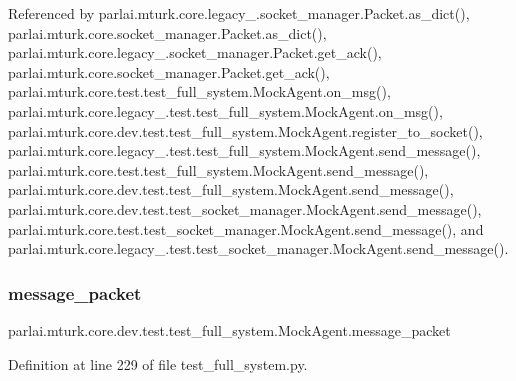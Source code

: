 Referenced by parlai.\+mturk.\+core.\+legacy\+\_.\+socket\+\_\+manager.\+Packet.\+as\+\_\+dict(), parlai.\+mturk.\+core.\+socket\+\_\+manager.\+Packet.\+as\+\_\+dict(), parlai.\+mturk.\+core.\+legacy\+\_.\+socket\+\_\+manager.\+Packet.\+get\+\_\+ack(), parlai.\+mturk.\+core.\+socket\+\_\+manager.\+Packet.\+get\+\_\+ack(), parlai.\+mturk.\+core.\+test.\+test\+\_\+full\+\_\+system.\+Mock\+Agent.\+on\+\_\+msg(), parlai.\+mturk.\+core.\+legacy\+\_.\+test.\+test\+\_\+full\+\_\+system.\+Mock\+Agent.\+on\+\_\+msg(), parlai.\+mturk.\+core.\+dev.\+test.\+test\+\_\+full\+\_\+system.\+Mock\+Agent.\+register\+\_\+to\+\_\+socket(), parlai.\+mturk.\+core.\+legacy\+\_.\+test.\+test\+\_\+full\+\_\+system.\+Mock\+Agent.\+send\+\_\+message(), parlai.\+mturk.\+core.\+test.\+test\+\_\+full\+\_\+system.\+Mock\+Agent.\+send\+\_\+message(), parlai.\+mturk.\+core.\+dev.\+test.\+test\+\_\+full\+\_\+system.\+Mock\+Agent.\+send\+\_\+message(), parlai.\+mturk.\+core.\+dev.\+test.\+test\+\_\+socket\+\_\+manager.\+Mock\+Agent.\+send\+\_\+message(), parlai.\+mturk.\+core.\+test.\+test\+\_\+socket\+\_\+manager.\+Mock\+Agent.\+send\+\_\+message(), and parlai.\+mturk.\+core.\+legacy\+\_.\+test.\+test\+\_\+socket\+\_\+manager.\+Mock\+Agent.\+send\+\_\+message().

\mbox{\label{classparlai_1_1mturk_1_1core_1_1dev_1_1test_1_1test__full__system_1_1MockAgent_a273dda6dd229cd506e2c0b3f6477c859}} 
\subsubsection{\texorpdfstring{message\+\_\+packet}{message\_packet}}
{\footnotesize\ttfamily parlai.\+mturk.\+core.\+dev.\+test.\+test\+\_\+full\+\_\+system.\+Mock\+Agent.\+message\+\_\+packet}



Definition at line 229 of file test\+\_\+full\+\_\+system.\+py.



